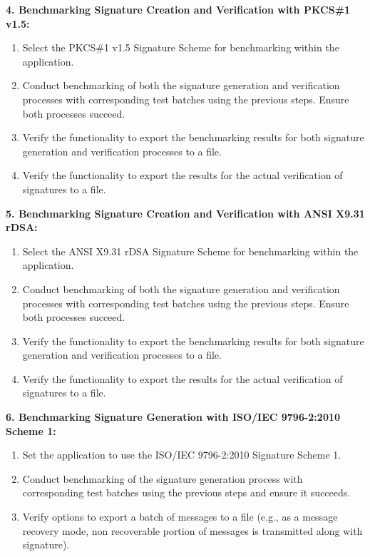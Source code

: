 \documentclass[]{final_report}
\theoremstyle{definition}
\begin{document}
\textbf{4. Benchmarking Signature Creation and Verification with PKCS\#1 v1.5:}
\begin{enumerate}
\item Select the PKCS\#1 v1.5 Signature Scheme for benchmarking within the application.
\item Conduct benchmarking of both the signature generation and verification processes with corresponding test batches using the previous steps. Ensure both processes succeed.
\item Verify the functionality to export the benchmarking results for both signature generation and verification processes to a file.
\item Verify the functionality to export the results for the actual verification of signatures to a file.
\end{enumerate}


\textbf{5. Benchmarking Signature Creation and Verification with ANSI X9.31 rDSA:}
\begin{enumerate}
\item Select the ANSI X9.31 rDSA Signature Scheme for benchmarking within the application.
\item Conduct benchmarking of both the signature generation and verification processes with corresponding test batches using the previous steps. Ensure both processes succeed.
\item Verify the functionality to export the benchmarking results for both signature generation and verification processes to a file.
\item Verify the functionality to export the results for the actual verification of signatures to a file.
\end{enumerate}


\textbf{6. Benchmarking Signature Generation with ISO/IEC 9796-2:2010 Scheme 1:}
\begin{enumerate}
\item Set the application to use the ISO/IEC 9796-2:2010 Signature Scheme 1.
\item Conduct benchmarking of  the signature generation process with corresponding test batches using the previous steps and ensure it succeeds.
\item Verify options to export a batch of messages to a file (e.g., as a message recovery mode, non recoverable portion of messages is transmitted along with signature).
\end{enumerate}
\end{document}
